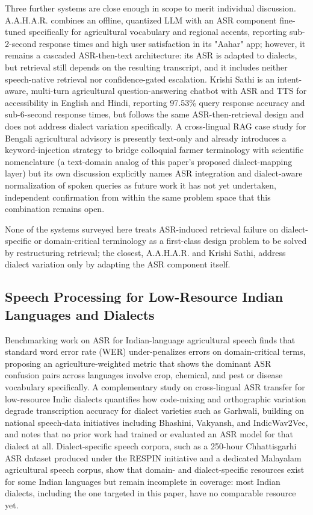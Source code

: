 \documentclass[conference]{IEEEtran}
\begin{document}
Three further systems are close enough in scope to merit individual discussion. A.A.H.A.R. \cite{dubey2025aahar} combines an offline, quantized LLM with an ASR component fine-tuned specifically for agricultural vocabulary and regional accents, reporting sub-2-second response times and high user satisfaction in its "Aahar" app; however, it remains a cascaded ASR-then-text architecture: its ASR is adapted to dialects, but retrieval still depends on the resulting transcript, and it includes neither speech-native retrieval nor confidence-gated escalation. Krishi Sathi \cite{vijayvargia2025krishisathi} is an intent-aware, multi-turn agricultural question-answering chatbot with ASR and TTS for accessibility in English and Hindi, reporting 97.53\% query response accuracy and sub-6-second response times, but follows the same ASR-then-retrieval design and does not address dialect variation specifically. A cross-lingual RAG case study for Bengali agricultural advisory \cite{hossain2026bengalirag} is presently text-only and already introduces a keyword-injection strategy to bridge colloquial farmer terminology with scientific nomenclature (a text-domain analog of this paper's proposed dialect-mapping layer) but its own discussion explicitly names ASR integration and dialect-aware normalization of spoken queries as future work it has not yet undertaken, independent confirmation from within the same problem space that this combination remains open.

None of the systems surveyed here treats ASR-induced retrieval failure on dialect-specific or domain-critical terminology as a first-class design problem to be solved by restructuring retrieval; the closest, A.A.H.A.R. and Krishi Sathi, address dialect variation only by adapting the ASR component itself.

\subsection{Speech Processing for Low-Resource Indian Languages and Dialects}

Benchmarking work on ASR for Indian-language agricultural speech \cite{benchmarkingasr2026} finds that standard word error rate (WER) under-penalizes errors on domain-critical terms, proposing an agriculture-weighted metric that shows the dominant ASR confusion pairs across languages involve crop, chemical, and pest or disease vocabulary specifically. A complementary study on cross-lingual ASR transfer for low-resource Indic dialects \cite{dialectmatters2026} quantifies how code-mixing and orthographic variation degrade transcription accuracy for dialect varieties such as Garhwali, building on national speech-data initiatives including Bhashini, Vakyansh, and IndicWav2Vec, and notes that no prior work had trained or evaluated an ASR model for that dialect at all. Dialect-specific speech corpora, such as a 250-hour Chhattisgarhi ASR dataset \cite{singh2023respin} produced under the RESPIN initiative and a dedicated Malayalam agricultural speech corpus, show that domain- and dialect-specific resources exist for some Indian languages but remain incomplete in coverage: most Indian dialects, including the one targeted in this paper, have no comparable resource yet.
\end{document}
